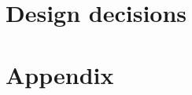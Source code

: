 \documentclass[11pt,fleqn]{book}
\begin{document}
% 
% 
%   
% 
%   
%   
%   
% 
% 
%  
%   
%   
%   
% 
% 
% 
%   
%   
%   
%   
%   
%   
%   
%   
%   
%  
%

 \part{Design decisions}
 \newpage
 




  
 \appendix 
 \part{Appendix}

  

 
 \newpage
 
 \newpage
 
 \newpage
 
 \newpage
 
 \newpage
 
\end{document}
